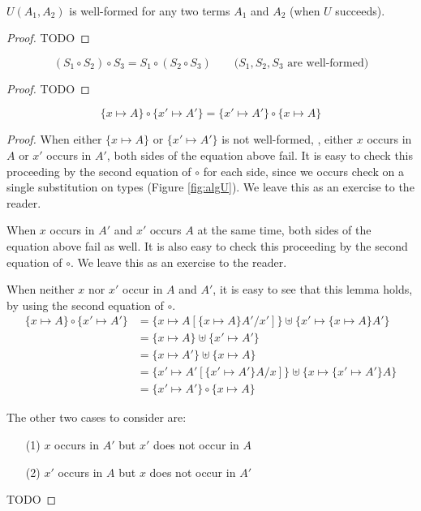 \begin{proposition}
	~\\ \indent
	$U(A_1,A_2)$ is well-formed for any two terms $A_1$ and $A_2$
	(when $U$ succeeds).
\end{proposition}
\begin{proof}
	TODO
\end{proof}


\begin{theorem}
	\[(S_1\circ S_2) \circ S_3 = S_1 \circ (S_2 \circ S_3)
	\qquad\text{($S_1, S_2, S_3$ are well-formed)}
	\]
\end{theorem}
\begin{proof}
	TODO
\end{proof}

\begin{lemma}\label{lem:commsinglesinglesubst}
\[ \{x\mapsto A\}\circ\{x'\mapsto A'\} = \{x'\mapsto A'\}\circ\{x\mapsto A\} \]
\end{lemma}
\begin{proof}
When either $\{x\mapsto A\}$ or $\{x'\mapsto A'\}$ is not well-formed,
\ie, either $x$ occurs in $A$ or $x'$ occurs in $A'$,
both sides of the equation above fail.
It is easy to check this proceeding by the second equation of $\circ$
for each side, since we occurs check on a single substitution on types
(Figure \ref{fig:algU}). We leave this as an exercise to the reader.

When $x$ occurs in $A'$ and $x'$ occurs $A$ at the same time,
both sides of the equation above fail as well.
It is also easy to check this proceeding by the second equation of $\circ$.
We leave this as an exercise to the reader.

When neither $x$ nor $x'$ occur in $A$ and $A'$, it is easy to see
that this lemma holds, by using the second equation of $\circ$.
\begin{align*}
\{x\mapsto A\}\circ\{x'\mapsto A'\}
&= \{x\mapsto A[\{x\mapsto A\} A'/x']\}\uplus\{x'\mapsto\{x\mapsto A\} A'\} \\
&= \{x\mapsto A\}\uplus\{x'\mapsto A'\} \\
&= \{x\mapsto A'\}\uplus\{x\mapsto A\} \\
&= \{x'\mapsto A'[\{x'\mapsto A'\}A/x]\}\uplus\{x\mapsto\{x'\mapsto A'\}A\} \\
&= \{x'\mapsto A'\}\circ\{x\mapsto A\}
\end{align*}

The other two cases to consider are:
\begin{itemize}
\item[(1)] $x$ occurs in $A'$ but $x'$ does not occur in $A$
\item[(2)] $x'$ occurs in $A$ but $x$ does not occur in $A'$
\end{itemize}

TODO
\end{proof}

